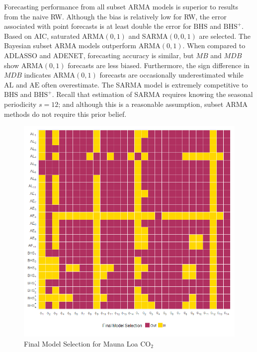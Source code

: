 Forecasting performance from all subset ARMA models is superior to results from the naive RW. Although the bias is relatively low for RW, the error associated with point forecasts is at least double the error for $\textrm{BHS}$ and $\textrm{BHS}^+$. Based on AIC, saturated ARMA$(0,1)$ and SARMA$(0,0,1)$ are selected. The Bayesian subset ARMA models outperform ARMA$(0,1)$. When compared to ADLASSO and ADENET, forecasting accuracy is similar, but $MB$ and $MDB$ show ARMA$(0,1)$ forecasts are less biased. Furthermore, the sign difference in $MDB$ indicates ARMA$(0,1)$ forecasts are occasionally underestimated while $\textrm{AL}$ and $\textrm{AE}$ often overestimate. The SARMA model is extremely competitive to $\textrm{BHS}$ and $\textrm{BHS}^+$. Recall that estimation of SARMA requires knowing the seasonal periodicity $s=12$; and although this is a reasonable assumption, subset ARMA methods do not require this prior belief.

\begin{figure}[htbp]
	\caption{Final Model Selection for Mauna Loa $\textrm{CO}_2$ }
	\center
	\label{fig:maunaloaselect}
	\includegraphics[scale=0.42]{maunaloaselect}
\end{figure}

